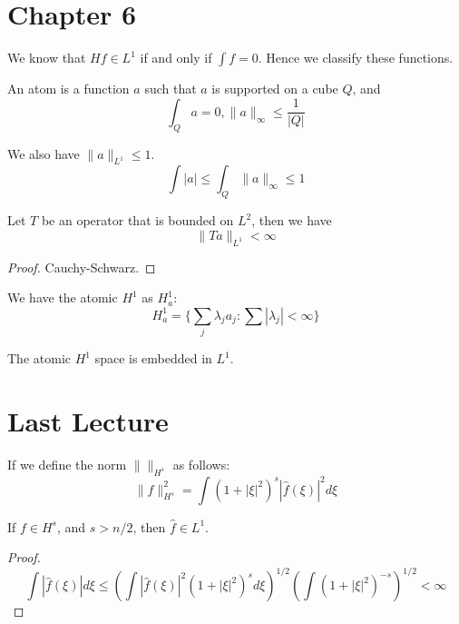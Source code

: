 \section{Chapter 6}
We know that $Hf\in L^1$ if and only if $\int f=0$. Hence we classify these functions.
\begin{definition}[atom]
    An atom is a function $a$ such that $a$ is supported on a cube $Q$, and 
    \begin{equation*}
        \int_Q a=0, \|a\|_\infty\leq\frac{1}{|Q|}
    \end{equation*}
\end{definition}
\begin{remark}
    We also have $\|a\|_{L^1}\leq 1$.
    \begin{equation*}
        \int|a|\leq \int_Q \|a\|_\infty\leq 1
    \end{equation*}
\end{remark}
\begin{proposition}
    Let $T$ be an operator that is bounded on $L^2$, then we have 
    \begin{equation*}
        \|Ta\|_{L^1}<\infty
    \end{equation*}
\end{proposition}
\begin{proof}
    Cauchy-Schwarz.
\end{proof}
\begin{definition}[atomic $H^1$]
    We have the atomic $H^1$ as $H_a^1$:  
    \begin{equation*}
        H_a^1=\{\sum_{j}\lambda_ja_j: \sum|\lambda_j|<\infty\}
    \end{equation*}
\end{definition}
\begin{remark}
    The atomic $H^1$ space is embedded in $L^1$.
\end{remark}




\newpage
\section{Last Lecture}
If we define the norm $\|\|_{H^s}$ as follows:
\begin{equation*}
    \|f\|_{H^s}^2=\int(1+|\xi|^2)^s|\hat{f}(\xi)|^2d\xi
\end{equation*}
\begin{proposition}
    If $f\in H^s$, and $s>n/2$, then $\hat{f}\in L^1$.
\end{proposition}
\begin{proof}
    \begin{equation*}
        \int |\hat{f}(\xi)|d\xi\leq \left(\int |\hat{f}(\xi)|^2(1+|\xi|^2)^sd\xi\right)^{1/2}\left(\int (1+|\xi|^2)^{-s}\right)^{1/2}<\infty
    \end{equation*}
\end{proof}

